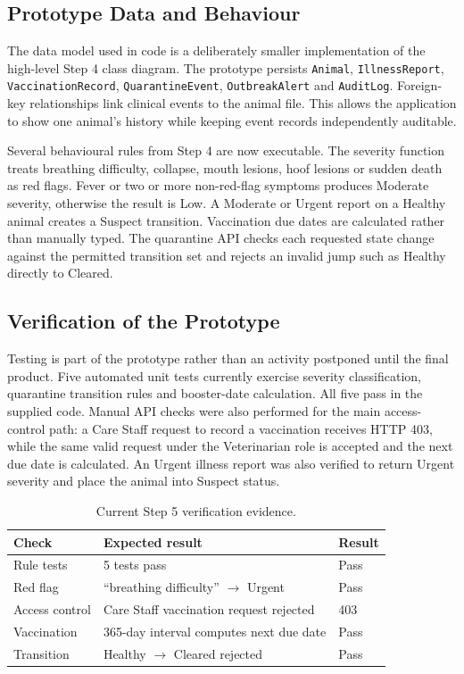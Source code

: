 \documentclass[10pt,twocolumn]{article}
\begin{document}
\subsection{Prototype Data and Behaviour}
The data model used in code is a deliberately smaller implementation of the high-level Step 4 class diagram. The prototype persists \texttt{Animal}, \texttt{IllnessReport}, \texttt{VaccinationRecord}, \texttt{QuarantineEvent}, \texttt{OutbreakAlert} and \texttt{AuditLog}. Foreign-key relationships link clinical events to the animal file. This allows the application to show one animal's history while keeping event records independently auditable.

Several behavioural rules from Step 4 are now executable. The severity function treats breathing difficulty, collapse, mouth lesions, hoof lesions or sudden death as red flags. Fever or two or more non-red-flag symptoms produces Moderate severity, otherwise the result is Low. A Moderate or Urgent report on a Healthy animal creates a Suspect transition. Vaccination due dates are calculated rather than manually typed. The quarantine API checks each requested state change against the permitted transition set and rejects an invalid jump such as Healthy directly to Cleared.

\subsection{Verification of the Prototype}
Testing is part of the prototype rather than an activity postponed until the final product. Five automated unit tests currently exercise severity classification, quarantine transition rules and booster-date calculation. All five pass in the supplied code. Manual API checks were also performed for the main access-control path: a Care Staff request to record a vaccination receives HTTP 403, while the same valid request under the Veterinarian role is accepted and the next due date is calculated. An Urgent illness report was also verified to return Urgent severity and place the animal into Suspect status.

\begin{table}[ht]
\caption{Current Step 5 verification evidence.}
\small
\begin{tabularx}{\columnwidth}{p{}X p{}}
\toprule
Check & Expected result & Result \\
\midrule
Rule tests & 5 tests pass & Pass \\
Red flag & ``breathing difficulty'' $\rightarrow$ Urgent & Pass \\
Access control & Care Staff vaccination request rejected & 403 \\
Vaccination & 365-day interval computes next due date & Pass \\
Transition & Healthy $\rightarrow$ Cleared rejected & Pass \\
\bottomrule
\end{tabularx}
\end{table}
\end{document}
